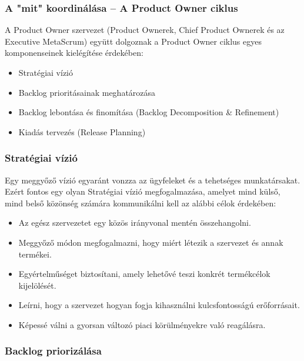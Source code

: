 \documentclass[12pt,a4paper,parskip=full]{scrartcl}
\begin{document}
\subsubsection{A "mit" koordinálása – A Product Owner ciklus}\label{coordinating-the-what}

A Product Owner szervezet (Product Ownerek, Chief Product Ownerek és az Executive MetaScrum) együtt dolgoznak a Product Owner ciklus egyes komponenseinek kielégítése érdekében:

\begin{itemize}
\itemsep1pt\parskip0pt
\item
 Stratégiai vízió
\item
 Backlog prioritásainak meghatározása
\item
 Backlog lebontása és finomítása (Backlog Decomposition \& Refinement)
\item
 Kiadás tervezés (Release Planning)
\end{itemize}

\subsubsection{Stratégiai vízió}\label{strategic-vision}

Egy meggyőző vízió egyaránt vonzza az ügyfeleket és a tehetséges munkatársakat. Ezért fontos egy olyan Stratégiai vízió megfogalmazása, amelyet mind külső, mind belső közönség számára kommunikálni kell az alábbi célok érdekében:

\begin{itemize}
\itemsep1pt\parskip0pt
\item
 Az egész szervezetet egy közös irányvonal mentén összehangolni.
\item
 Meggyőző módon megfogalmazni, hogy miért létezik a szervezet és annak termékei.
\item
 Egyértelműséget biztosítani, amely lehetővé teszi konkrét termékcélok kijelölését.
\item
 Leírni, hogy a szervezet hogyan fogja kihasználni kulcsfontosságú erőforrásait.
\item
 Képessé válni a gyorsan változó piaci körülményekre való reagálásra.
\end{itemize}

\subsubsection{Backlog priorizálása}\label{backlog-prioritization}
\end{document}
